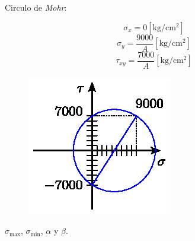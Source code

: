 \documentclass[letter,10pt,twoside]{article}
\begin{document}
Circulo de \emph{Mohr}:

\begin{equation*}
    \sigma_x = 0[\text{kg}/\text{cm}^2]
\end{equation*}
\begin{equation*}
    \sigma_y = \frac{9000}{A}[\text{kg}/\text{cm}^2]
\end{equation*}
\begin{equation*}
    \tau_{xy} = \frac{7000}{A}[\text{kg}/\text{cm}^2]
\end{equation*}

\begin{figure}[H]
\centering
\includegraphics[scale=1.2]{resources/f81.eps}
\end{figure}

$\sigma_{\text{max}}$, $\sigma_{\text{min}}$, $\alpha$ y $\beta$.
\end{document}
